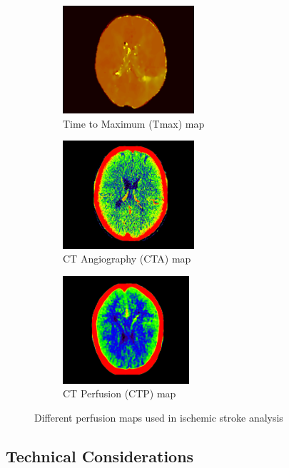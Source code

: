 \begin{figure}[htbp]
    \begin{subfigure}[t]{0.3\textwidth}
        \includegraphics[width=\textwidth,height=4cm,keepaspectratio]{figures/perfusion_tmax.png}
        \caption{Time to Maximum (Tmax) map}
        \label{fig:tmax}
    \end{subfigure}
    \hfill
    \begin{subfigure}[t]{0.3\textwidth}
        \includegraphics[width=\textwidth,height=4cm,keepaspectratio]{figures/perfusion_cta.png}
        \caption{CT Angiography (CTA) map}
        \label{fig:cta}
    \end{subfigure}
    \hfill
    \begin{subfigure}[t]{0.3\textwidth}
        \includegraphics[width=\textwidth,height=4cm,keepaspectratio]{figures/perfusion_ctp.png}
        \caption{CT Perfusion (CTP) map}
        \label{fig:ctp}
    \end{subfigure}
    \caption{Different perfusion maps used in ischemic stroke analysis}
    \label{fig:perfusion_maps}
\end{figure}

\subsection{Technical Considerations}

